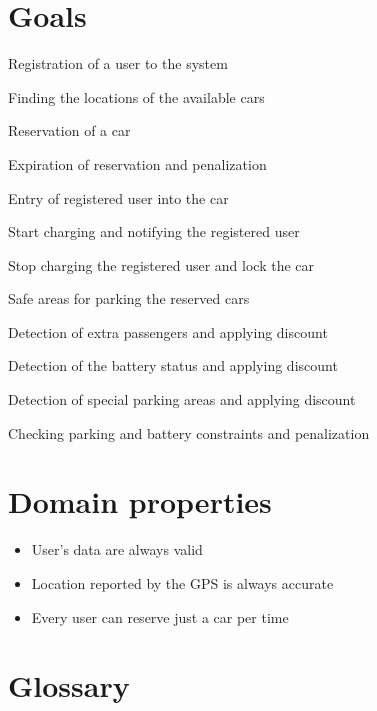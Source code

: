 \section{Goals}
\begin{enumerate}[label={[G\arabic*]},labelindent=\parindent,leftmargin=*]
	\item \label{goal:registration} Registration of a user to the system
	\item \label{goal:cars_location} Finding the locations of the available cars
	\item \label{goal:reservation} Reservation of a car
	\item \label{goal:expiration} Expiration of reservation and penalization
	\item \label{goal:entry} Entry of registered user into the car
	\item \label{goal:charging} Start charging and notifying the registered user
	\item \label{goal:car_locking} Stop charging the registered user and lock the car
	\item \label{goal:safe_areas} Safe areas for parking the reserved cars
	\item \label{goal:passengers} Detection of extra passengers and applying discount
	\item \label{goal:battery} Detection of the battery status and applying discount
	\item \label{goal:special_areas} Detection of special parking areas and applying discount
	\item \label{goal:constraints} Checking parking and battery constraints and penalization
\end{enumerate}

\section{Domain properties}
\begin{itemize}
	\item User's data are always valid
	\item Location reported by the GPS is always accurate
	\item Every user can reserve just a car per time
\end{itemize}

\section{Glossary}

